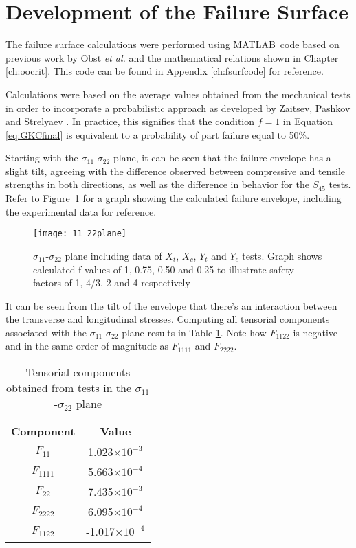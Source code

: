 \documentclass[main.tex]{subfiles}
\begin{document}
\section{Development of the Failure Surface} \label{sec:fsc}

The failure surface calculations were performed using MATLAB\textregistered~code based on previous work by Obst \emph{et al.} \cite{Obst2018} and the mathematical relations shown in Chapter \ref{ch:oocrit}. This code can be found in Appendix \ref{ch:fsurfcode} for reference.

Calculations were based on the average values obtained from the mechanical tests in order to incorporate a probabilistic approach as developed by Zaitsev, Pashkov and Strelyaev \cite{Zaitsev1975}. In practice, this signifies that the condition $f=1$ in Equation \ref{eq:GKCfinal} is equivalent to a probability of part failure equal to 50\%.

Starting with the $\sigma_{11}$-$\sigma_{22}$ plane, it can be seen that the failure envelope has a slight tilt, agreeing with the difference observed between compressive and tensile strengths in both directions, as well as the difference in behavior for the $S_{45}$ tests. Refer to Figure~\ref{fig:1122plane} for a graph showing the calculated failure envelope, including the experimental data for reference.

\begin{figure}[!htbp]
	\center
	\texttt{[image: 11\_22plane]}
	\captionsetup{justification=centering} %
	\caption[failure envelope in the $\sigma_{11}$-$\sigma_{22}$ plane]{$\sigma_{11}$-$\sigma_{22}$ plane including data of $X_t$, $X_c$, $Y_t$ and $Y_c$ tests. Graph shows calculated f values of 1, 0.75, 0.50 and 0.25 to illustrate safety factors of 1, 4/3, 2 and 4 respectively} \label{fig:1122plane}
\end{figure}

It can be seen from the tilt of the envelope that there's an interaction between the transverse and longitudinal stresses. Computing all tensorial components associated with the  $\sigma_{11}$-$\sigma_{22}$ plane results in Table \ref{tab:1122calc}. Note how $F_{1122}$ is negative and in the same order of magnitude as $F_{1111}$ and $F_{2222}$. 

\begin{table} [h]
	\centering
	\caption{Tensorial components obtained from tests in the $\sigma_{11}$-$\sigma_{22}$ plane}
	\begin{tabular}{ c c } 
		\toprule
		\textbf{Component} & \textbf{Value} \\
		\midrule
		$F_{11}$ & 1.023$\times 10^{-3}$\\ [1ex]
		$F_{1111}$ & 5.663$\times 10^{-4}$\\ [1ex]
		$F_{22}$ & 7.435$\times 10^{-3}$\\ [1ex]
		$F_{2222}$ & 6.095$\times 10^{-4}$\\ [1ex]
		$F_{1122}$ & -1.017$\times 10^{-4}$\\ [1ex]
		\bottomrule
	\end{tabular}
	\label{tab:1122calc}
\end{table}  
\end{document}
